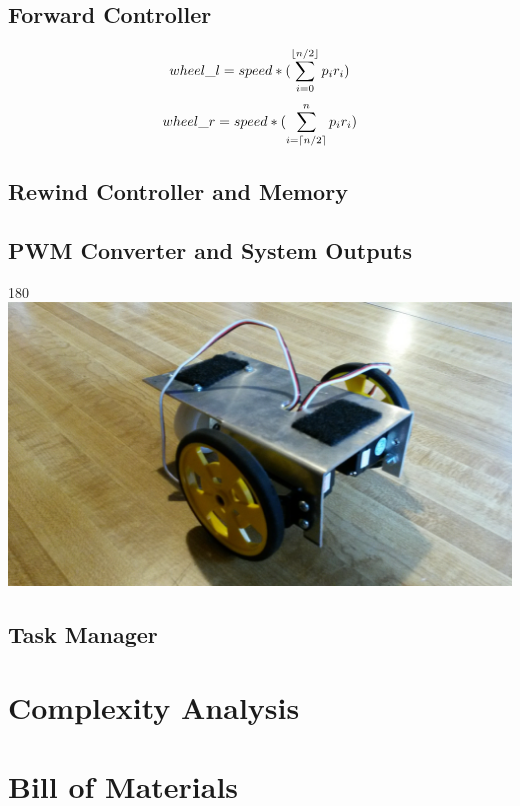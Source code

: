 \documentclass{article}
\DeclarePairedDelimiter{\ceil}{\lceil}{\rceil}
\DeclarePairedDelimiter{\floor}{\lfloor}{\rfloor}
\begin{document}
\subsection*{Forward Controller}
\begin{equation}
wheel\_l = speed * (\sum_{i=0}^{\floor{n/2}}{p_ir_i}) \end{equation}
\begin{equation}wheel\_r = speed * (\sum_{i=\ceil{n/2}}^{n}{p_ir_i})
\end{equation}
\subsection*{Rewind Controller and Memory}
\subsection*{PWM Converter and System Outputs}
\begin{turn}{180} 
  \includegraphics[width=\textwidth]{chassis.jpg}
\end{turn}
\subsection*{Task Manager} 

\section*{Complexity Analysis}

\section*{Bill of Materials}
\end{document}
